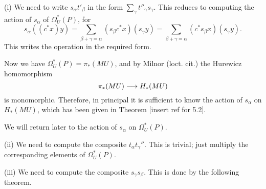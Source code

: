 \documentclass[../main]{subfiles}
\begin{document}
(i) We need to write $s_\alpha t'_\beta$ in the form $\sum_\gamma t''_\gamma s_\gamma$. This reduces to computing the action of $s_\alpha$ of $\Omega_U^*(P)$, for
\[s_\alpha((c^* x)y) = \sum_{\beta  + \gamma = \alpha} (s_\beta c^* x)(s_\gamma y) = \sum_{\beta  + \gamma = \alpha} (c^* s_\beta x)(s_\gamma y) .\]
This writes the operation in the required form.

Now we have $\Omega_U^*(P) = \pi_*(MU)$, and by Milnor (loct. cit.) the Hurewicz homomorphism
\[\pi_*(MU) \longrightarrow H_*(MU)\]
is monomorphic. Therefore, in principal it is sufficient to know the action of $s_\alpha$ on $H_*(MU)$, which has been given in Theorem [insert ref for 5.2].

We will return later to the action of $s_\alpha$ on $\Omega_U^*(P)$.

(ii) We need to compute the composite $t_\alpha t_\gamma ''$. This is trivial; just multiply the corresponding elements of $\Omega_U^*(P)$.

(iii) We need to compute the composite $s_\gamma s_\beta$. This is done by the following theorem.
\end{document}
